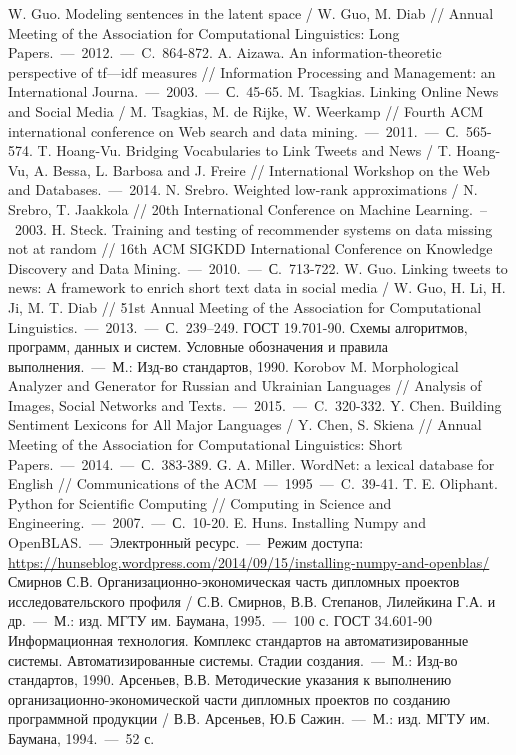 
\begin{thebibliography}{0}
     W. Guo. Modeling sentences in the latent space / W. Guo, M. Diab // Annual Meeting of the Association for Computational Linguistics: Long Papers.~---~2012.~---~C.~864-872.
     A. Aizawa. An information-theoretic perspective of tf—idf measures // Information Processing and Management: an International Journa.~---~2003.~---~С.~45-65.
     M. Tsagkias. Linking Online News and Social Media / M. Tsagkias, M. de Rijke, W. Weerkamp // Fourth ACM international conference on Web search and data mining.~---~2011.~---~С.~565-574.
     T. Hoang-Vu. Bridging Vocabularies to Link Tweets and News / T. Hoang-Vu, A. Bessa, L. Barbosa and J. Freire // International Workshop on the Web and Databases.~---~2014.
     N. Srebro. Weighted low-rank approximations / N. Srebro, T. Jaakkola // 20th International Conference on Machine Learning.~--~2003.
     H. Steck. Training and testing of recommender systems on data missing not at random // 16th ACM SIGKDD International Conference on Knowledge Discovery and Data Mining.~---~2010.~---~С.~713-722.
     W. Guo. Linking tweets to news: A framework to enrich short text data in social media /  W. Guo, H. Li, H. Ji, M. T. Diab // 51st Annual Meeting of the Association for Computational Linguistics.~---~2013.~---~С.~239–249.
     ГОСТ 19.701-90. Схемы алгоритмов, программ, данных и систем. Условные обозначения и правила выполнения.~---~М.: Изд-во стандартов, 1990.
     Korobov M. Morphological Analyzer and Generator for Russian and Ukrainian Languages // Analysis of Images, Social Networks and Texts.~---~2015.~---~C.~320-332.
     Y. Chen. Building Sentiment Lexicons for All Major Languages / Y. Chen, S. Skiena // Annual Meeting of the Association for Computational Linguistics: Short Papers.~---~2014.~---~С.~383-389.
     G. A. Miller. WordNet: a lexical database for English // Communications of the ACM~---~1995~---~C.~39-41.
     T. E. Oliphant. Python for Scientific Computing // Computing in Science and Engineering.~---~2007.~---~С.~10-20.
     E. Huns. Installing Numpy and OpenBLAS.~---~Электронный ресурс.~---~Режим доступа: \\\url{https://hunseblog.wordpress.com/2014/09/15/installing-numpy-and-openblas/}
     Смирнов С.В. Организационно-экономическая часть дипломных проектов исследовательского профиля / С.В. Смирнов, В.В. Степанов, Лилейкина Г.А. и др.~---~М.: изд. МГТУ им. Баумана, 1995.~---~100 с.
     ГОСТ 34.601-90 Информационная технология. Комплекс стандартов на автоматизированные системы. Автоматизированные системы. Стадии создания.~---~М.: Изд-во стандартов, 1990.
     Арсеньев, В.В. Методические указания к выполнению организационно-экономической части дипломных проектов по созданию программной продукции / В.В. Арсеньев, Ю.Б Сажин.~---~М.: изд. МГТУ им. Баумана, 1994.~---~52 с.

\end{thebibliography}